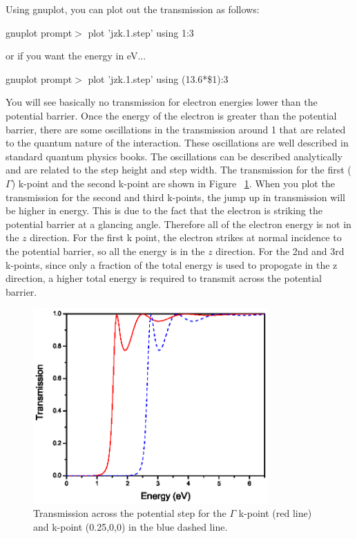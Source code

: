 \documentclass[10pt]{article}
\begin{document}
Using gnuplot, you can plot out the transmission as follows:

\begin{center} 
gnuplot prompt$>$ plot 'jzk.1.step' using 1:3
\end{center}
or if you want the energy in eV...

\begin{center}
gnuplot prompt$>$ plot 'jzk.1.step' using (13.6*\$1):3
\end{center}

You will see basically no transmission for electron energies lower than the potential barrier.  Once the energy of the electron is greater than the potential barrier, there are some oscillations in the transmission around 1 that are related to the quantum nature of the interaction.  These oscillations are well described in standard quantum physics books.  The oscillations can be described analytically and are related to the step height and step width.  The transmission for the first ($\Gamma$) k-point and the second k-point are shown in Figure ~\ref{jzk.1and2.step}.  When you plot the transmission for the second and third k-points, the jump up in transmission will be higher in energy.  This is due to the fact that the electron is striking the potential barrier at a glancing angle.  Therefore all of the electron energy is not in the $z$ direction.  For the first k point, the electron strikes at normal incidence to the potential barrier, so all the energy is in the $z$ direction.  For the 2nd and 3rd k-points, since only a fraction of the total energy is used to propogate in the z direction, a higher total energy is required to transmit across the potential barrier.

\begin{figure}
\begin{center}
\centering
\includegraphics[angle=0,width=9.00cm]{jzk.1and2.step.eps}
\caption{Transmission across the potential step for the $\Gamma$ k-point (red line) and k-point (0.25,0,0) in the blue dashed line.}
\label{jzk.1and2.step} 
\end{center}
\end{figure}
\end{document}

